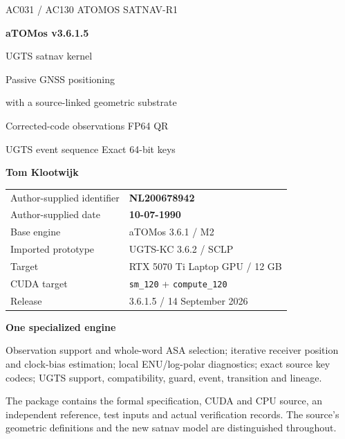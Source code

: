 \documentclass[11pt,a4paper]{article}
\newcommand{\code}[1]{\texttt{#1}}
\begin{document}
\begin{titlepage}
\thispagestyle{empty}
{\sffamily\color{accent}\large AC031 / AC130 ATOMOS \hfill SATNAV-R1}\par
\vspace{20mm}
{\sffamily\bfseries\fontsize{54}{60}\selectfont\color{ink}aTOMos v3.6.1.5}\par
\vspace{9mm}
{\sffamily\fontsize{31}{37}\selectfont UGTS satnav kernel}\par
\vspace{5mm}
{\sffamily\fontsize{21}{28}\selectfont\color{gold}Passive GNSS positioning\par
with a source-linked geometric substrate}\par
\vspace{12mm}
{\large Corrected-code observations \;\textperiodcentered\; FP64 QR\par
UGTS event sequence \;\textperiodcentered\; Exact 64-bit keys}\par
\vspace{18mm}
{\sffamily\bfseries\Large Tom Klootwijk}\par
\begin{tabular}{@{}ll@{}}
Author-supplied identifier & \textbf{NL200678942}\\
Author-supplied date & \textbf{10-07-1990}\\
Base engine & aTOMos 3.6.1 / M2\\
Imported prototype & UGTS-KC 3.6.2 / SCLP\\
Target & RTX 5070 Ti Laptop GPU / 12 GB\\
CUDA target & \code{sm\_120} + \code{compute\_120}\\
Release & 3.6.1.5 / 14 September 2026\\
\end{tabular}
\vfill
\begin{panel}
\textbf{One specialized engine}\par
Observation support and whole-word ASA selection; iterative receiver position and
clock-bias estimation; local ENU/log-polar diagnostics; exact source key codecs;
UGTS support, compatibility, guard, event, transition and lineage.
\end{panel}
{\small\color{muted}The package contains the formal specification, CUDA and CPU source, an independent
reference, test inputs and actual verification records. The source's geometric definitions and the new
satnav model are distinguished throughout.}
\end{titlepage}
\setcounter{page}{2}
\end{document}
